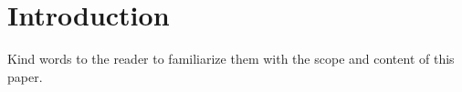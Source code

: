 \section*{Introduction}

Kind words to the reader to familiarize them with the scope and content of 
this paper.
